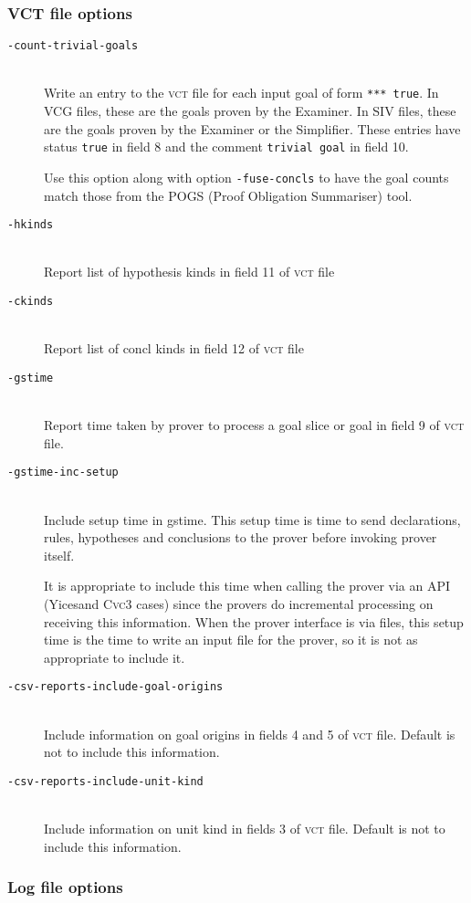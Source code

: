 \documentclass[12pt,fleqn]{article}
\newcommand{\cvcthree}{\textsc{Cvc}3}
\newcommand{\yices}{Yices}
\newcommand{\csv}{\textsc{vct}}
\newcommand{\optionb}[1]{\item[\texttt{-{#1}}]\ \\}
\begin{document}
\subsubsection{VCT file options}


\begin{description}

\optionb{count-trivial-goals}
   Write an entry to the \csv{} file for each input goal of form 
   \texttt{*** true}.
   In VCG files, these are the goals proven by the Examiner.
   In SIV files, these are the goals proven by the Examiner or the 
   Simplifier.
   These entries have status \texttt{true} in field 8 and
   the comment \texttt{trivial goal} in field 10.

   Use this option along with option \texttt{-fuse-concls} to have the
   goal counts match those from the POGS (Proof Obligation Summariser)
   tool.

\optionb{hkinds} Report list of hypothesis kinds in field 11 of \csv{} file
\optionb{ckinds} Report list of concl kinds in field 12 of \csv{} file
\optionb{gstime} 
  Report time taken by prover to process a goal slice or goal
       in field 9 of \csv{} file.
\optionb{gstime-inc-setup}
  Include setup time in gstime.  This setup time is time to 
  send declarations, rules, hypotheses and conclusions to the prover before
  invoking prover itself.  

  It is appropriate to include this time when calling the prover via 
  an API (\yices and \cvcthree{} cases) since
  the provers do incremental processing on receiving this information.
  When the prover interface is via files, this setup time is the time to 
  write an input file for the prover, so it is not as appropriate to include
  it.

\optionb{csv-reports-include-goal-origins}
  Include information on goal origins in fields 4 and 5 of \csv{} file.
  Default is not to include this information.

\optionb{csv-reports-include-unit-kind}
  Include information on unit kind in fields 3 of \csv{} file.
  Default is not to include this information.
\end{description}

\subsubsection{Log file options}
\end{document}
